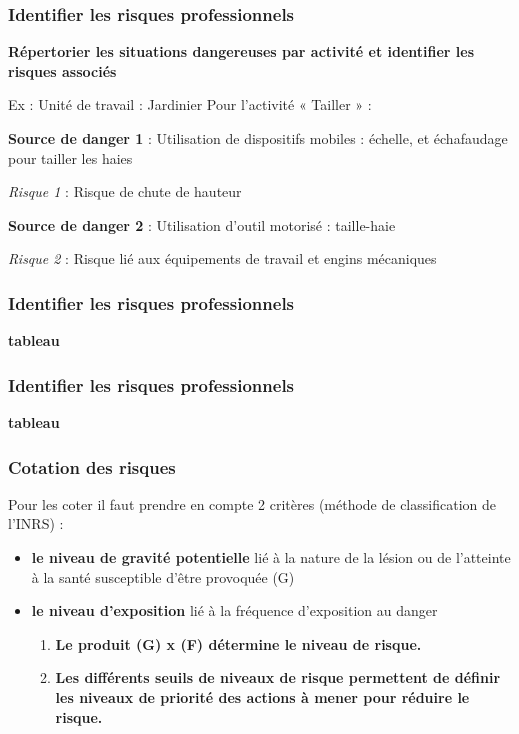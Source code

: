 \documentclass{beamer}
\begin{document}
\begin{frame}
\frametitle{Identifier les risques professionnels}

\textbf{Répertorier les situations dangereuses par activité et identifier les risques associés }

Ex : Unité de travail : Jardinier
Pour l’activité « Tailler » :

\textbf{Source de danger 1} :
 Utilisation de dispositifs mobiles : échelle, et échafaudage pour tailler les haies
 
\textit{Risque 1} : Risque de chute de hauteur

\textbf{Source de danger 2} : 
 Utilisation d’outil motorisé : taille-haie
 
\textit{Risque 2} : Risque lié aux équipements de travail et engins mécaniques  
\end{frame}

\begin{frame}
\frametitle{Identifier les risques professionnels}

\textbf{tableau}
\end{frame}

\begin{frame}
\frametitle{Identifier les risques professionnels}

\textbf{tableau}
\end{frame}

\begin{frame}
\frametitle{Cotation des risques}

Pour les coter il faut prendre en compte 2 critères (méthode de classification de l’INRS) :
\begin{itemize}
\item \textbf{le niveau de gravité potentielle} lié à la nature de la lésion ou de l’atteinte à la santé susceptible d’être provoquée (G)

\item \textbf{le niveau d’exposition} lié à la fréquence d’exposition au danger
\begin{enumerate}
\item \textbf{Le produit (G) x (F) détermine le niveau de risque.}
\item \textbf{Les différents seuils de niveaux de risque permettent de définir les niveaux de priorité des actions à mener pour réduire le risque.}
\end{enumerate}
\end{itemize}
\end{frame}
\end{document}
